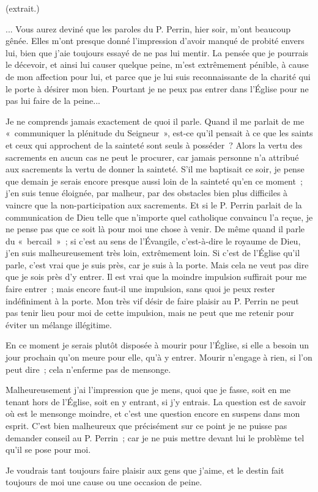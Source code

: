 \documentclass[french,twoside]{book} %
\begin{document}
\begin{center}
(extrait.)\end{center}
\noindent ... Vous aurez deviné que les paroles du P. Perrin, hier soir, m'ont beaucoup gênée. Elles m'ont presque donné l'impression d'avoir manqué de probité envers lui, bien que j'aie toujours essayé de ne pas lui mentir. La pensée que je pourrais le décevoir, et ainsi lui causer quelque peine, m'est extrêmement pénible, à cause de mon affection pour lui, et parce que je lui suis reconnaissante de la charité qui le porte à désirer mon bien. Pourtant je ne peux pas entrer dans l'Église pour ne pas lui faire de la peine...\par
Je ne comprends jamais exactement de quoi il parle. Quand il me parlait de me « communiquer la plénitude du Seigneur », est-ce qu'il pensait à ce que les saints et ceux qui approchent de la sainteté sont seuls à posséder ? Alors la vertu des sacrements en aucun cas ne peut le procurer, car jamais personne n'a attribué aux sacrements la vertu de donner la sainteté. S'il me baptisait ce soir, je pense que demain je serais encore presque aussi loin de la sainteté qu'en ce moment ; j'en suis tenue éloignée, par malheur, par des obstacles bien plus difficiles à vaincre que la non-participation aux sacrements. Et si le P. Perrin parlait de la communication de Dieu telle que n'importe quel catholique convaincu l'a reçue, je ne pense pas que ce soit là pour moi une chose à venir. De même quand il parle du « bercail » ; si c'est au sens de l'Évangile, c'est-à-dire le royaume de Dieu, j'en suis malheureusement très loin, extrêmement loin. Si c'est de l'Église qu'il parle, c'est vrai que je suis près, car je suis à la porte. Mais cela ne veut pas dire que je sois près d'y entrer. Il est vrai que la moindre impulsion suffirait pour me faire entrer ; mais encore faut-il une impulsion, sans quoi je peux rester indéfiniment à la porte. Mon très vif désir de faire plaisir au P. Perrin ne peut pas tenir lieu pour moi de cette impulsion, mais ne peut que me retenir pour éviter un mélange illégitime.\par
En ce moment je serais plutôt disposée à mourir pour l'Église, si elle a besoin un jour prochain qu'on meure pour elle, qu'à y entrer. Mourir n'engage à rien, si l'on peut dire ; cela n'enferme pas de mensonge.\par
Malheureusement j'ai l'impression que je mens, quoi que je fasse, soit en me tenant hors de l'Église, soit en y entrant, si j'y entrais. La question est de savoir où est le mensonge moindre, et c'est une question encore en suspens dans mon esprit. C'est bien malheureux que précisément sur ce point je ne puisse pas demander conseil au P. Perrin ; car je ne puis mettre devant lui le problème tel qu'il se pose pour moi.\par
Je voudrais tant toujours faire plaisir aux gens que j'aime, et le destin fait toujours de moi une cause ou une occasion de peine.\par
\end{document}
